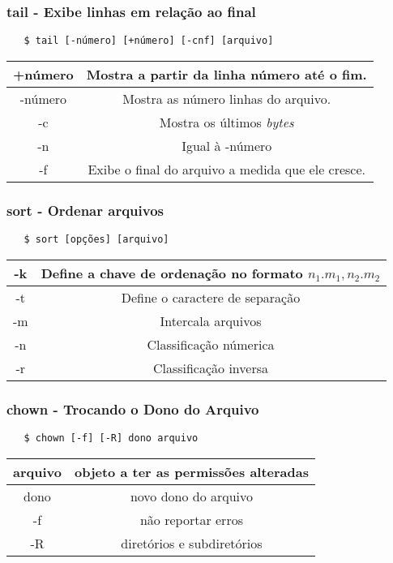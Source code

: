\documentclass{beamer}
\begin{document}
\begin{frame}[fragile]
   \frametitle{tail - Exibe linhas em relação ao final}
   \begin{verbatim}
   $ tail [-número] [+número] [-cnf] [arquivo] 
   \end{verbatim}
   \begin{table}
      \begin{tabular}{ c | c }
         +número & Mostra a partir da linha \textsf{número} até o fim. \\
         \hline 
         -número & Mostra as \textsf{número} linhas do arquivo. \\
         \hline
         -c & Mostra os últimos \textit{bytes} \\
         \hline
         -n & Igual à -número \\
         \hline
         -f & Exibe o final do arquivo a medida que ele cresce. \\
      \end{tabular}
   \end{table}
\end{frame}

\begin{frame}[fragile]
   \frametitle{sort - Ordenar arquivos}
   \begin{verbatim}
   $ sort [opções] [arquivo]
   \end{verbatim}
   \begin{table}
      \begin{tabular}{ c | c }
         -k & Define a chave de ordenação no formato $n_{1}.m_{1},n_{2}.m_{2}$ \\
         \hline 
         -t & Define o caractere de separação \\ 
         \hline
         -m & Intercala arquivos \\
         \hline
         -n & Classificação númerica \\
         \hline
         -r & Classificação inversa \\
      \end{tabular}
   \end{table}
\end{frame}

\begin{frame}[fragile]
   \frametitle{chown - Trocando o Dono do Arquivo}
   \begin{verbatim}
   $ chown [-f] [-R] dono arquivo
   \end{verbatim}
   \begin{table}
      \begin{tabular}{ c | c }
         arquivo & objeto a ter as permissões alteradas \\
         \hline 
         dono & novo dono do arquivo \\ 
         \hline
         -f & não reportar erros \\
         \hline
         -R & diretórios e subdiretórios \\
      \end{tabular}
   \end{table}
\end{frame}
\end{document}
